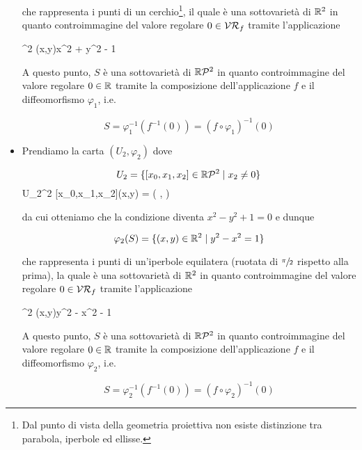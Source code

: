 \begin{itemize}
	che rappresenta i punti di un cerchio\footnote{%
		Dal punto di vista della geometria proiettiva non esiste distinzione tra parabola, iperbole ed ellisse.%
	}, il quale è una sottovarietà di $ \mathbb{R}^{2} $ in quanto controimmagine del valore regolare $ 0 \in \mathcal{VR}_{f} $ tramite l'applicazione
	
	{\R^{2}}{\R}
	{(x,y)}{x^{2} + y^{2} - 1}
	
	A questo punto, $ S $ è una sottovarietà di $ \mathbb{R}\mathcal{P}^{2} $ in quanto controimmagine del valore regolare $ 0 \in \mathbb{R} $ tramite la composizione dell'applicazione $ f $	e il diffeomorfismo $ \varphi_{1} $, i.e.
	
	\begin{equation}
		S = \varphi_{1}^{-1} (f^{-1}(0)) = (f \circ \varphi_{1})^{-1} (0)
	\end{equation}
	
	\item Prendiamo la carta $ (U_{2},\varphi_{2}) $ dove
	
	\begin{equation}
		U_{2} = \{ [x_{0},x_{1},x_{2}] \in \mathbb{R}\mathcal{P}^{2} \mid x_{2} \neq 0 \}
	\end{equation}
		{U_{2}}{\R^{2}}
		{[x_{0},x_{1},x_{2}]}{(x,y) = \left( ,  \right)}
	
	da cui otteniamo che la condizione diventa $ x^{2} - y^{2} + 1 = 0 $ e dunque
	
	\begin{equation}
		\varphi_{2}(S) = \{ (x,y) \in \mathbb{R}^{2} \mid y^{2} - x^{2} = 1 \}
	\end{equation}
	
	che rappresenta i punti di un'iperbole equilatera (ruotata di $ \sfrac{\pi}{2} $ rispetto alla prima), la quale è una sottovarietà di $ \mathbb{R}^{2} $ in quanto controimmagine del valore regolare $ 0 \in \mathcal{VR}_{f} $ tramite l'applicazione
	
		{\R^{2}}{\R}
		{(x,y)}{y^{2} - x^{2} - 1}
	
	A questo punto, $ S $ è una sottovarietà di $ \mathbb{R}\mathcal{P}^{2} $ in quanto controimmagine del valore regolare $ 0 \in \mathbb{R} $ tramite la composizione dell'applicazione $ f $	e il diffeomorfismo $ \varphi_{2} $, i.e.
	
	\begin{equation}
		S = \varphi_{2}^{-1} (f^{-1}(0)) = (f \circ \varphi_{2})^{-1} (0)
	\end{equation}
\end{itemize}

